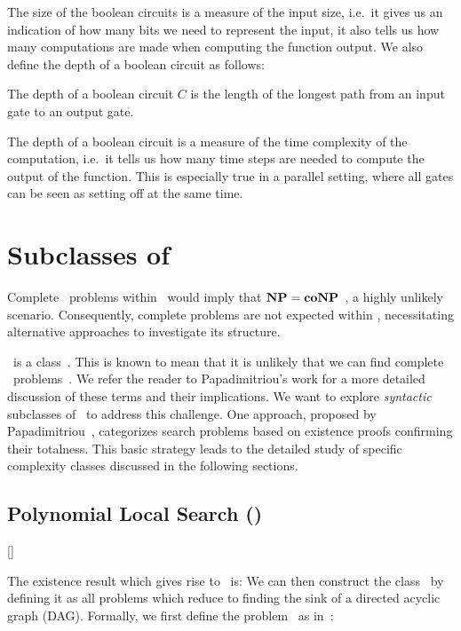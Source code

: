 The size of the boolean circuits is a measure of the input size, i.e.\ it gives us an indication of how many bits we need to represent the input, it also tells us how many computations are made when computing the function output. We also define the depth of a boolean circuit as follows:

\begin{definition}
	The depth of a boolean circuit $C$ is the length of the longest path from an input gate to an output gate.
\end{definition}

The depth of a boolean circuit is a measure of the time complexity of the computation, i.e.\ it tells us how many time steps are needed to compute the output of the function. This is especially true in a parallel setting, where all gates can be seen as setting off at the same time.

\section{Subclasses of \TFNP}

Complete \FNP\ problems within \TFNP\ would imply that $\textbf{NP} = \textbf{coNP}$~, a highly unlikely scenario. Consequently, complete problems are not expected within \TFNP, necessitating alternative approaches to investigate its structure.

\TFNP\ is a  class~. This is known to mean that it is unlikely that we can find complete \TFNP\ problems~. We refer the reader to Papadimitriou's work  for a more detailed discussion of these terms and their implications. We want to explore \textit{syntactic} subclasses of \TFNP\ to address this challenge. One approach, proposed by Papadimitriou~\cite{papadimitriou_computational_1994}, categorizes search problems based on existence proofs confirming their totalness. This basic strategy leads to the detailed study of specific complexity classes discussed in the following sections.

\subsection{Polynomial Local Search (\PLS)}[\PLS]

The existence result which gives rise to \PLS\ is:
We can then construct the class \PLS\ by defining it as all problems which reduce to finding the sink of a directed acyclic graph (DAG). Formally, we first define the problem \Localopt\ as in~:

